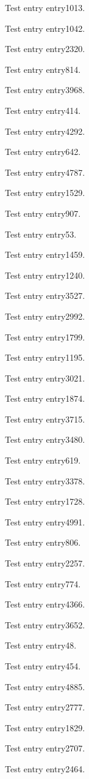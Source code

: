 Test entry \gls{entry1013}.

Test entry \gls{entry1042}.

Test entry \gls{entry2320}.

Test entry \gls{entry814}.

Test entry \gls{entry3968}.

Test entry \gls{entry414}.

Test entry \gls{entry4292}.

Test entry \gls{entry642}.

Test entry \gls{entry4787}.

Test entry \gls{entry1529}.

Test entry \gls{entry907}.

Test entry \gls{entry53}.

Test entry \gls{entry1459}.

Test entry \gls{entry1240}.

Test entry \gls{entry3527}.

Test entry \gls{entry2992}.

Test entry \gls{entry1799}.

Test entry \gls{entry1195}.

Test entry \gls{entry3021}.

Test entry \gls{entry1874}.

Test entry \gls{entry3715}.

Test entry \gls{entry3480}.

Test entry \gls{entry619}.

Test entry \gls{entry3378}.

Test entry \gls{entry1728}.

Test entry \gls{entry4991}.

Test entry \gls{entry806}.

Test entry \gls{entry2257}.

Test entry \gls{entry774}.

Test entry \gls{entry4366}.

Test entry \gls{entry3652}.

Test entry \gls{entry48}.

Test entry \gls{entry454}.

Test entry \gls{entry4885}.

Test entry \gls{entry2777}.

Test entry \gls{entry1829}.

Test entry \gls{entry2707}.

Test entry \gls{entry2464}.

